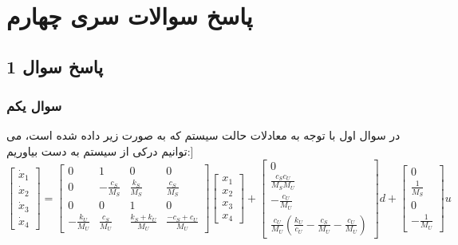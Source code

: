 
\chapter*{پاسخ سوالات سری چهارم}

\section*{ پاسخ سوال 1}
\subsection*{سوال یکم}

در سوال اول با توجه به معادلات حالت سیستم که به صورت زیر داده شده است، می توانیم درکی از سیستم به دست بیاوریم:]
\[
\begin{bmatrix}
	\dot{x}_1 \\ \dot{x}_2 \\ \dot{x}_3 \\ \dot{x}_4
\end{bmatrix}
=
\begin{bmatrix}
	0 & 1 & 0 & 0 \\
	0 & -\frac{c_S}{M_S} & \frac{k_S}{M_S} & \frac{c_S}{M_S} \\
	0 & 0 & 1 & 0 \\
	-\frac{k_U}{M_U} & \frac{c_S}{M_U} & \frac{k_S + k_U}{M_U} & \frac{-c_S + c_U}{M_U}
\end{bmatrix}
\begin{bmatrix}
	x_1 \\ x_2 \\ x_3 \\ x_4
\end{bmatrix}
+
\begin{bmatrix}
	0 \\ \frac{c_S c_U}{M_S M_U} \\ -\frac{c_U}{M_U} \\ \frac{c_U}{M_U}\left(\frac{k_U}{c_U} - \frac{c_S}{M_U} - \frac{c_U}{M_U}\right)
\end{bmatrix}
d
+
\begin{bmatrix}
	0 \\ \frac{1}{M_S} \\ 0 \\ -\frac{1}{M_U}
\end{bmatrix}
u
\]


